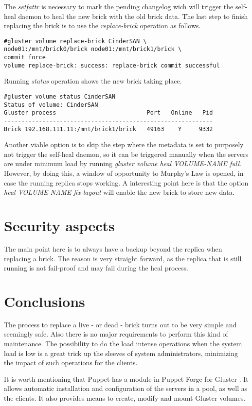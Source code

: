 The \textit{setfattr} is necessary to mark the pending changelog wich will trigger the self-heal daemon to heal the new brick with the old brick data. 
The last step to finish replacing the brick is to use the \textit{replace-brick} operation as follows.

\begin{lstlisting}[frame=single]
#gluster volume replace-brick CinderSAN \
node01:/mnt/brick0/brick node01:/mnt/brick1/brick \
commit force
volume replace-brick: success: replace-brick commit successful
\end{lstlisting}

Running \textit{status} operation shows the new brick taking place.

\begin{lstlisting}[frame=single]
#gluster volume status CinderSAN
Status of volume: CinderSAN
Gluster process                          Port   Online   Pid
------------------------------------------------------------
Brick 192.168.111.11:/mnt/brick1/brick   49163    Y     9332
\end{lstlisting}

Another viable option is to skip the step where the metadata is set to purposely not trigger the self-heal daemon, so it can be triggered manually when the servers are under minimum load by running \textit{gluster volume heal \emph{VOLUME-NAME} full}. However, by doing this, a window of opportunity to Murphy's Law \cite{Murphy} is opened, in case the running replica stops working. A interesting point here is that the option \textit{heal \emph{VOLUME-NAME} fix-layout} will enable the new brick to store new data.


\section{Security aspects}

The main point here is to always have a backup beyond the replica when replacing a brick. The reason is very straight forward, as the replica that is still running is not fail-proof and may fail during the heal process.


\section{Conclusions}

The process to replace a live - or dead - brick turns out to be very simple and seemingly safe. Also there is no major requirements to perform this kind of maintenance. The possibility to do the load intense operations when the system load is low is a great trick up the sleeves of system administrators, minimizing the impact of such operations for the clients.

It is worth mentioning that Puppet has a module in Puppet Forge for Gluster \cite{Puppet}. It allows automatic installation and configuration of the servers in a pool, as well as the clients. It also provides means to create, modify and mount Gluster volumes.






